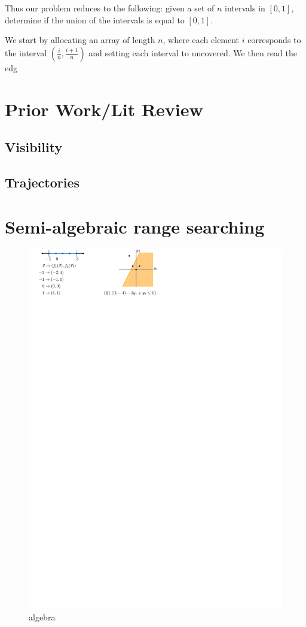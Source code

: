 \documentclass[a4paper, UKenglish]{lipics-v2018}
\begin{document}
Thus our problem reduces to the following: given a set of $n$ intervals in $[0,1]$, determine if the union of the intervals is equal to $[0,1]$.

We start by allocating an array of length $n$, where each element $i$ corresponds to the interval $(\frac{i}{n}, \frac{i+1}{n})$ and setting each interval to uncovered. We then read the edg


\section{Prior Work/Lit Review}
\subsection{Visibility}
\subsection{Trajectories}

\section{Semi-algebraic range searching}
\label{appx:rangesearch}


\begin{figure}[h]
    \centering
    \includegraphics{../algebraic}
    \caption{algebra}
    \label{fig:algebraic}
\end{figure}
\end{document}

